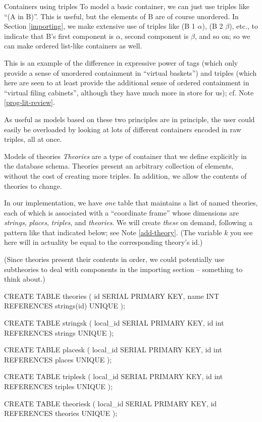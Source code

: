\begin{notate}{Containers using triples}  \label{containers-using-triples}
To model a basic container, we can just use triples like
``(A in B)''.  This is useful, but the elements of B are
of course unordered.  In Section \ref{importing}, we make
extensive use of triples like (B 1 $\alpha$), (B 2
$\beta$), etc., to indicate that B's first component is
$\alpha$, second component is $\beta$, and so on; so we
can make ordered list-like containers as well.

This is an example of the difference in expressive power
of tags (which only provide a sense of unordered
containment in ``virtual baskets'') and triples (which
here are seen to at least provide the additional sense of
ordered containment in ``virtual filing cabinets'',
although they have much more in store for us); cf. Note
\ref{prog-lit-review}.

As useful as models based on these two principles are in
principle, the user could easily be overloaded by looking
at lots of different containers encoded in raw triples,
all at once.
\end{notate}

\begin{notate}{Models of theories}\label{models-of-theories}
\emph{Theories} are a type of container that we define
explicitly in the database schema.  Theories present an
arbitrary collection of elements, without the cost of
creating more triples.  In addition, we allow the contents
of theories to change.

In our implementation, we have \emph{one} table that
maintains a list of named theories, each of which is
associated with a ``coordinate frame'' whose dimensions
are \emph{strings}, \emph{places}, \emph{triples}, and
\emph{theories}.  We will create \emph{these} on demand,
following a pattern like that indicated below; see Note
\ref{add-theory}.  (The variable $k$ you see here will in
actuality be equal to the corresponding theory's id.)

(Since theories present their contents in order, we could
potentially use subtheories to deal with components in
the importing section -- something to think about.)
\end{notate}

\begin{idea}
CREATE TABLE theories (
  id SERIAL PRIMARY KEY,
  name INT REFERENCES strings(id) UNIQUE
);

CREATE TABLE stringsk (
  local_id SERIAL PRIMARY KEY,
  id int REFERENCES strings UNIQUE
);

CREATE TABLE placesk (
  local_id SERIAL PRIMARY KEY,
  id int REFERENCES places UNIQUE
);

CREATE TABLE triplesk (
  local_id SERIAL PRIMARY KEY,
  id int REFERENCES triples UNIQUE
);

CREATE TABLE theoriesk (
  local_id SERIAL PRIMARY KEY,
  id REFERENCES theories UNIQUE
);
\end{idea}


